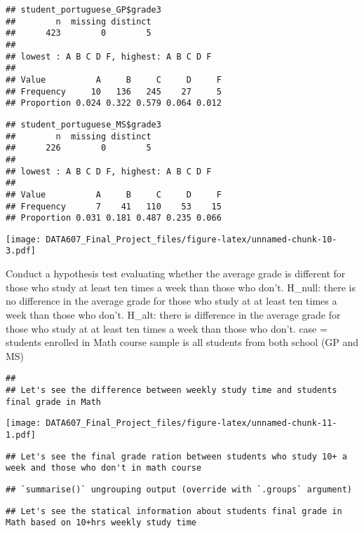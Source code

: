 \documentclass[
]{article}
\begin{document}
\begin{verbatim}
## student_portuguese_GP$grade3 
##        n  missing distinct 
##      423        0        5 
## 
## lowest : A B C D F, highest: A B C D F
##                                         
## Value          A     B     C     D     F
## Frequency     10   136   245    27     5
## Proportion 0.024 0.322 0.579 0.064 0.012
\end{verbatim}

\begin{verbatim}
## student_portuguese_MS$grade3 
##        n  missing distinct 
##      226        0        5 
## 
## lowest : A B C D F, highest: A B C D F
##                                         
## Value          A     B     C     D     F
## Frequency      7    41   110    53    15
## Proportion 0.031 0.181 0.487 0.235 0.066
\end{verbatim}

\texttt{[image: DATA607\_Final\_Project\_files/figure-latex/unnamed-chunk-10-3.pdf]}

Conduct a hypothesis test evaluating whether the average grade is
different for those who study at least ten times a week than those who
don't. H\_null: there is no difference in the average grade for those
who study at at least ten times a week than those who don't. H\_alt:
there is difference in the average grade for those who study at at least
ten times a week than those who don't. case = students enrolled in Math
course sample is all students from both school (GP and MS)

\begin{verbatim}
## 
## Let's see the difference between weekly study time and students final grade in Math
\end{verbatim}

\texttt{[image: DATA607\_Final\_Project\_files/figure-latex/unnamed-chunk-11-1.pdf]}

\begin{verbatim}
## Let's see the final grade ration between students who study 10+ a week and those who don't in math course
\end{verbatim}

\begin{verbatim}
## `summarise()` ungrouping output (override with `.groups` argument)
\end{verbatim}

\begin{verbatim}
## Let's see the statical information about students final grade in Math based on 10+hrs weekly study time
\end{verbatim}
\end{document}
